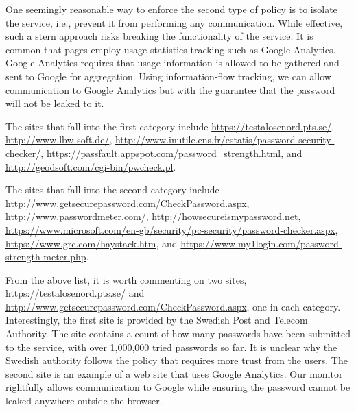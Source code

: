 \documentclass{llncs}
\begin{document}
One seemingly reasonable way to enforce the second type of policy is to
isolate the service, i.e., prevent it from performing any communication.
While effective, such a stern approach risks breaking the functionality of the service.
It is common that pages employ usage statistics tracking such as Google
Analytics. Google Analytics requires that usage information is allowed to be gathered and
sent to Google for aggregation. Using information-flow tracking, we
can allow communication to Google Analytics but with the guarantee
that the password will not be leaked to it.

The sites that fall into the first category include 
\url{https://testalosenord.pts.se/},
\url{http://www.lbw-soft.de/},
\url{http://www.inutile.ens.fr/estatis/password-security-checker/},
\url{https://passfault.appspot.com/password_strength.html}, and
\url{http://geodsoft.com/cgi-bin/pwcheck.pl}.

The sites that fall into the second category include 
\url{http://www.getsecurepassword.com/CheckPassword.aspx},
\url{http://www.passwordmeter.com/},
\url{http://howsecureismypassword.net},
\url{https://www.microsoft.com/en-gb/security/pc-security/password-checker.aspx},
\url{https://www.grc.com/haystack.htm}, and
\url{https://www.my1login.com/password-strength-meter.php}.


From the above list, it is worth commenting on two sites, 
\url{https://testalosenord.pts.se/} and
\url{http://www.getsecurepassword.com/CheckPassword.aspx}, one in each
category. Interestingly, the first site is provided by the Swedish Post
and Telecom Authority. The site contains a count of how many passwords 
have been submitted to the service, with over 1,000,000 tried
passwords so far. It is unclear why the Swedish authority follows the
policy that requires more trust from the users. The second site is an example of a web site that uses
Google Analytics. Our monitor rightfully allows communication to
Google while ensuring the password cannot be leaked anywhere outside the browser. 
\end{document}
